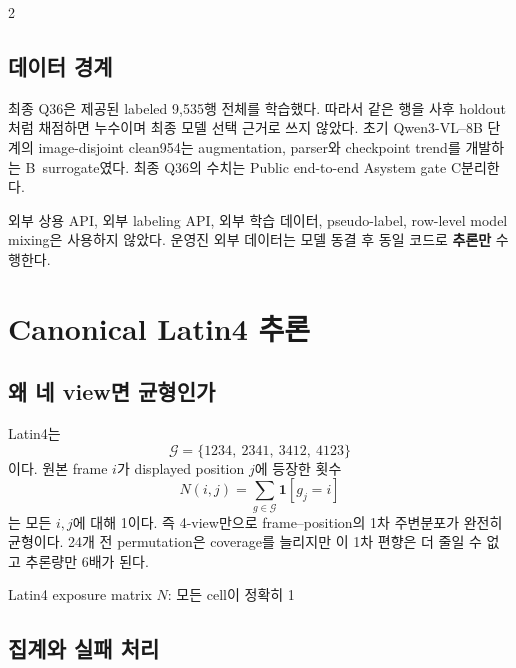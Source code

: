 \documentclass[9pt,a4paper]{extarticle}
\newcommand{\tightnote}[1]{{\scriptsize #1}}
\newcommand{\evidA}{\textsf{\scriptsize A}}
\newcommand{\evidB}{\textsf{\scriptsize B}}
\newcommand{\evidC}{\textsf{\scriptsize C}}
\begin{document}
\begin{multicols}{2}
\subsection{데이터 경계}

최종 Q36은 제공된 labeled 9,535행 전체를 학습했다. 따라서 같은 행을 사후
holdout처럼 채점하면 누수이며 최종 모델 선택 근거로 쓰지 않았다. 초기
Qwen3-VL--8B 단계의 image-disjoint clean954는 augmentation, parser와
checkpoint trend를 개발하는 \evidB\ surrogate였다. 최종 Q36의 수치는 Public
end-to-end \evidA\와 system gate \evidC\로 분리한다.

외부 상용 API, 외부 labeling API, 외부 학습 데이터, pseudo-label,
row-level model mixing은 사용하지 않았다. 운영진 외부 데이터는 모델 동결 후
동일 코드로 \textbf{추론만} 수행한다.

\columnbreak
\section{Canonical Latin4 추론}

\subsection{왜 네 view면 균형인가}

Latin4는
\[
\mathcal{G}=\{1234,\ 2341,\ 3412,\ 4123\}
\]
이다. 원본 frame $i$가 displayed position $j$에 등장한 횟수
\[
N(i,j)=\sum_{g\in\mathcal{G}}\mathbf{1}[g_j=i]
\]
는 모든 $i,j$에 대해 1이다. 즉 4-view만으로 frame--position의 1차 주변분포가
완전히 균형이다. 24개 전 permutation은 coverage를 늘리지만 이 1차 편향은 더
줄일 수 없고 추론량만 6배가 된다.

\begin{center}
\par\tightnote{Latin4 exposure matrix $N$: 모든 cell이 정확히 1}
\end{center}

\subsection{집계와 실패 처리}


\end{multicols}
\end{document}

